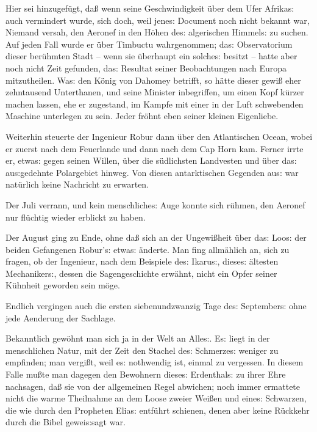 \documentclass[oneside,12pt]{book}
\newcommand{\s}{s:}
\begin{document}
Hier sei hinzugef\"ugt, da{\ss} wenn seine Geschwindigkeit \"uber dem
Ufer Afrika{\s} auch vermindert wurde, sich doch, weil jene{\s}
Document noch nicht bekannt war, Niemand versah, den Aeronef in den
H\"ohen de{\s} algerischen Himmel{\s} zu suchen. Auf jeden Fall wurde
er \"uber Timbuctu wahrgenommen; da{\s} Observatorium dieser
ber\"uhmten Stadt -- wenn sie \"uberhaupt ein solche{\s} besitzt --
hatte aber noch nicht Zeit gefunden, da{\s} Resultat seiner
Beobachtungen nach Europa mit\/zutheilen. Wa{\s} den K\"onig von
Dahomey betrifft, so h\"atte dieser gewi{\ss} eher zehntausend
Unterthanen, und seine Minister inbegriffen, um einen Kopf k\"urzer
machen lassen, ehe er zugestand, im Kampfe mit einer in der Luft
schwebenden Maschine unterlegen zu sein. Jeder fr\"ohnt eben seiner
kleinen Eigenliebe.

Weiterhin steuerte der Ingenieur Robur dann \"uber den Atlantischen
Ocean, wobei er zuerst nach dem Feuerlande und dann nach dem Cap Horn
kam. Ferner irrte er, etwa{\s} gegen seinen Willen, \"uber die
s\"udlichsten Landvesten und \"uber da{\s} au{\s}gedehnte Polargebiet
hinweg. Von diesen antarktischen Gegenden au{\s} war nat\"urlich
keine Nachricht zu erwarten.

Der Juli verrann, und kein menschliche{\s} Auge konnte sich r\"uhmen,
den Aeronef nur fl\"uchtig wieder erblickt zu haben.

Der August ging zu Ende, ohne da{\ss} sich an der Ungewi{\ss}heit
\"uber da{\s} Loo{\s} der beiden Gefangenen Robur'{\s} etwa{\s}
\"anderte. Man fing allm\"ahlich an, sich zu fragen, ob der
Ingenieur, nach dem Beispiele de{\s} Ikaru{\s}, diese{\s} \"altesten
Mechaniker{\s}, dessen die Sagengeschichte erw\"ahnt, nicht ein Opfer
seiner K\"uhnheit geworden sein m\"oge.

Endlich vergingen auch die ersten siebenundzwanzig Tage de{\s}
September{\s} ohne jede Aenderung der Sachlage.

Bekanntlich gew\"ohnt man sich ja in der Welt an Alle{\s}. E{\s}
liegt in der menschlichen Natur, mit der Zeit den Stachel de{\s}
Schmerze{\s} weniger zu empfinden; man vergi{\ss}t, weil e{\s}
nothwendig ist, einmal zu vergessen. In diesem Falle mu{\ss}te man
dagegen den Bewohnern diese{\s} Erdenthal{\s} zu ihrer Ehre
nachsagen, da{\ss} sie von der allgemeinen Regel abwichen; noch immer
ermattete nicht die warme Theilnahme an dem Loose zweier Wei{\ss}en
und eine{\s} Schwarzen, die wie durch den Propheten Elia{\s}
entf\"uhrt schienen, denen aber keine R\"uckkehr durch die Bibel
gewei{\s}sagt war.
\end{document}

